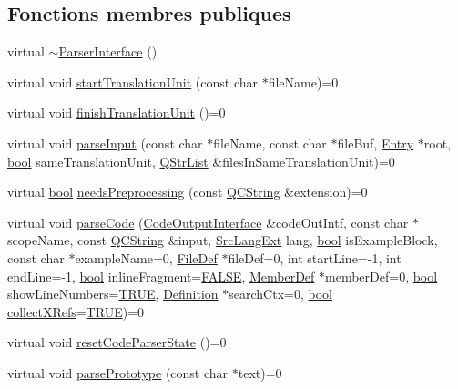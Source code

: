 \subsection*{Fonctions membres publiques}
\begin{DoxyCompactItemize}
\item 
virtual \hyperlink{class_parser_interface_ac468c7abd84cd5ab1263555d3f95f1ee}{$\sim$\+Parser\+Interface} ()
\item 
virtual void \hyperlink{class_parser_interface_a72478f87ead5fde10d7d6bbe32a73024}{start\+Translation\+Unit} (const char $\ast$file\+Name)=0
\item 
virtual void \hyperlink{class_parser_interface_af3acd64c6a33852e2e46e7288eb9c9cf}{finish\+Translation\+Unit} ()=0
\item 
virtual void \hyperlink{class_parser_interface_a09ced377e619d40b7339187bad88341e}{parse\+Input} (const char $\ast$file\+Name, const char $\ast$file\+Buf, \hyperlink{class_entry}{Entry} $\ast$root, \hyperlink{qglobal_8h_a1062901a7428fdd9c7f180f5e01ea056}{bool} same\+Translation\+Unit, \hyperlink{class_q_str_list}{Q\+Str\+List} \&files\+In\+Same\+Translation\+Unit)=0
\item 
virtual \hyperlink{qglobal_8h_a1062901a7428fdd9c7f180f5e01ea056}{bool} \hyperlink{class_parser_interface_a36c669b17b64a6e3847f27d70a5398d2}{needs\+Preprocessing} (const \hyperlink{class_q_c_string}{Q\+C\+String} \&extension)=0
\item 
virtual void \hyperlink{class_parser_interface_a2ffc28f9dd7c47e2581376a573426395}{parse\+Code} (\hyperlink{class_code_output_interface}{Code\+Output\+Interface} \&code\+Out\+Intf, const char $\ast$scope\+Name, const \hyperlink{class_q_c_string}{Q\+C\+String} \&input, \hyperlink{types_8h_a9974623ce72fc23df5d64426b9178bf2}{Src\+Lang\+Ext} lang, \hyperlink{qglobal_8h_a1062901a7428fdd9c7f180f5e01ea056}{bool} is\+Example\+Block, const char $\ast$example\+Name=0, \hyperlink{class_file_def}{File\+Def} $\ast$file\+Def=0, int start\+Line=-\/1, int end\+Line=-\/1, \hyperlink{qglobal_8h_a1062901a7428fdd9c7f180f5e01ea056}{bool} inline\+Fragment=\hyperlink{qglobal_8h_a10e004b6916e78ff4ea8379be80b80cc}{F\+A\+L\+S\+E}, \hyperlink{class_member_def}{Member\+Def} $\ast$member\+Def=0, \hyperlink{qglobal_8h_a1062901a7428fdd9c7f180f5e01ea056}{bool} show\+Line\+Numbers=\hyperlink{qglobal_8h_a04a6422a52070f0dc478693da640242b}{T\+R\+U\+E}, \hyperlink{class_definition}{Definition} $\ast$search\+Ctx=0, \hyperlink{qglobal_8h_a1062901a7428fdd9c7f180f5e01ea056}{bool} \hyperlink{tclscanner_8cpp_ac23b94d6976d5bb0c9f1885c5a2e7a53}{collect\+X\+Refs}=\hyperlink{qglobal_8h_a04a6422a52070f0dc478693da640242b}{T\+R\+U\+E})=0
\item 
virtual void \hyperlink{class_parser_interface_aee4fccd1865a4e8a6b9f2896811104ca}{reset\+Code\+Parser\+State} ()=0
\item 
virtual void \hyperlink{class_parser_interface_a5ebf0f524a296845befa22c85a4cc80b}{parse\+Prototype} (const char $\ast$text)=0
\end{DoxyCompactItemize}


